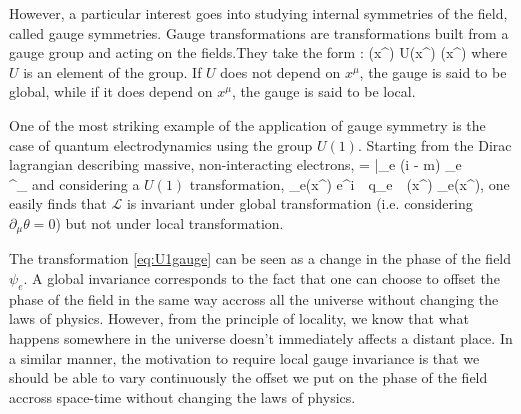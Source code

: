     However, a particular interest goes into studying internal symmetries of the field,
    called gauge symmetries. Gauge transformations are transformations built from a gauge
    group and acting on the fields.They take the form :
    {
        \psi(x^\mu)
        \rightarrow
        U(x^\mu) \psi(x^\mu)
    }
    where $U$ is an element of the group. If $U$ does not depend on $x^\mu$, the gauge is
    said to be global, while if it does depend on $x^\mu$, the gauge is said to be local.

    One of the most striking example of the application of gauge symmetry is the case of
    quantum electrodynamics using the group $U(1)$. Starting from the Dirac lagrangian
    describing massive, non-interacting electrons,
    {
        =
        \bar{\psi_e} (i \dslash - m) \psi_e
        \,\,\,\,\,\,\,
        \,\,\,\,\,\,\,
        \dslash {} \gamma^\mu \partial_\mu
    }
    and considering a $U(1)$ transformation,
    {
        \psi_e(x^\mu)
        \rightarrow
        e^{i \,\cdot\, q_e \,\cdot\, \theta(x^\mu)} \psi_e(x^\mu),
    }
    one easily finds that $\mathcal{L}$ is invariant under global transformation (i.e.
    considering $\partial_\mu \theta = 0$) but not under local transformation.

    The transformation \ref{eq:U1gauge} can be seen as a change in the phase of the field
    $\psi_e$. A global invariance corresponds to the fact that one can choose to offset
    the phase of the field in the same way accross all the universe without changing the
    laws of physics. However, from the principle of locality, we know that what happens
    somewhere in the universe doesn't immediately affects a distant place. In a similar
    manner, the motivation to require local gauge invariance is that we should be able to
    vary continuously the offset we put on the phase of the field accross space-time
    without changing the laws of physics.

